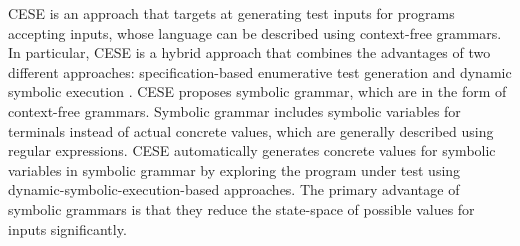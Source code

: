 CESE \cite{CESE} is an approach that targets at generating test inputs for programs accepting inputs, whose language can be described using context-free grammars. In particular, CESE is a hybrid approach that combines the advantages of two different approaches: specification-based enumerative test generation \cite{yagg} and dynamic symbolic execution \cite{system,symbolic,Test,counter,random}. CESE proposes symbolic grammar, which are in the form of context-free grammars. Symbolic grammar includes symbolic variables for terminals instead of actual concrete values, which are generally described using regular expressions. CESE automatically generates concrete values for symbolic variables in symbolic grammar by exploring the program under test using dynamic-symbolic-execution-based approaches. The primary advantage of symbolic grammars is that they reduce the state-space of possible values for inputs significantly.